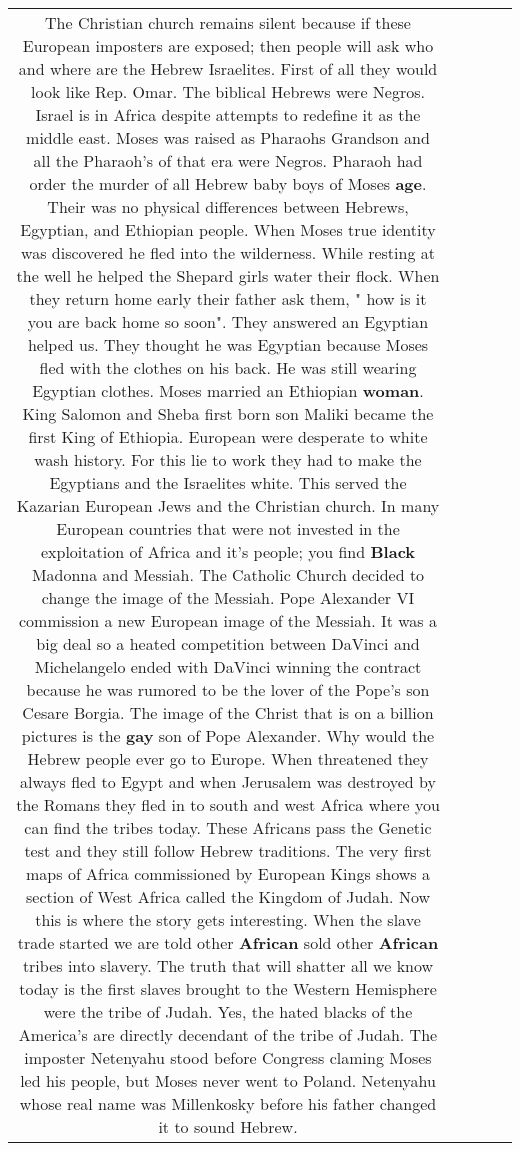 \documentclass[11pt]{article}
\newlength\mylength
\begin{document}
\begin{center}
\begin{longtable}{|C{.65\mylength}|C{.30\mylength}|C{.12\mylength}|C{.12\mylength}|C{.12\mylength}|}
The Christian church remains silent because if these European imposters are exposed; then people will ask who and where are the Hebrew Israelites.
First of all they would look like Rep. Omar. The biblical Hebrews were Negros. Israel is in Africa despite attempts to redefine it as the middle east. 
Moses was raised as Pharaohs Grandson and all the Pharaoh's of that era were Negros. Pharaoh had order the murder of all Hebrew baby boys of Moses \textbf{age}. Their was no physical differences between Hebrews, Egyptian, and Ethiopian people. When Moses true identity was discovered he fled into the wilderness. While resting at the well he helped the Shepard girls water their flock. When they return home early their father ask them, " how is it you are back home so soon". They answered an Egyptian helped us. They thought he was Egyptian because Moses fled with the clothes on his back. He was still wearing Egyptian clothes. Moses married an Ethiopian \textbf{woman}. King Salomon and Sheba first born son Maliki became the first King of Ethiopia. 
European were desperate to white wash history. For this lie to work they had to make the Egyptians and the Israelites white. This served the Kazarian European Jews and the Christian church. In many European countries that were not invested in the exploitation of Africa and it's people; you find \textbf{Black} Madonna and Messiah.
The Catholic Church decided to change the image of the Messiah. Pope Alexander VI commission a new European image of the Messiah. It was a big deal so a heated competition between DaVinci and Michelangelo ended with DaVinci winning the contract because he was rumored to be the lover of the Pope's son Cesare Borgia. The image of the Christ that is on a billion pictures is the \textbf{g\textbf{ay}} son of Pope Alexander. 
Why would the Hebrew people ever go to Europe. When threatened they always fled to Egypt and when Jerusalem was destroyed by the Romans they fled in to south and west Africa where you can find the tribes today. These Africans pass the Genetic test and they still follow Hebrew traditions. 
The very first maps of Africa commissioned by European Kings shows a section of West Africa called the Kingdom of Judah. Now this is where the story gets interesting. When the slave trade started we are told other \textbf{African} sold other \textbf{African} tribes into slavery. The truth that will shatter all we know today is the first slaves brought to the Western Hemisphere were the tribe of Judah. Yes, the hated blacks of the America's are directly decendant of the tribe of Judah.
The imposter Netenyahu stood before Congress claming Moses led his people, but Moses never went to Poland. Netenyahu whose real name was Millenkosky before his father changed it to sound Hebrew.

\end{longtable}
\end{center}
\end{document}
